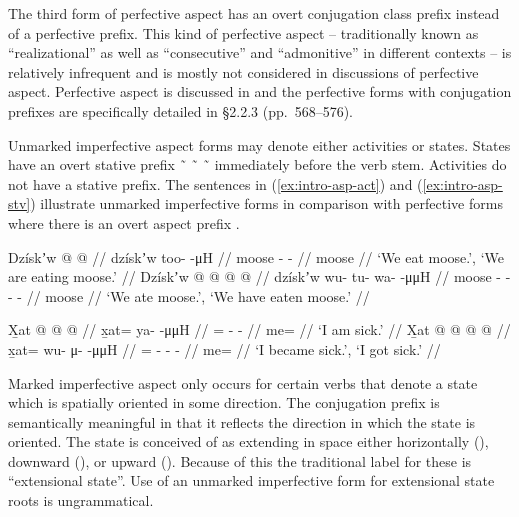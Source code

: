 \documentclass[12pt,letterpaper,oneside,article]{memoir}
\begin{document}
The third form of perfective aspect has an overt conjugation class prefix instead of a perfective prefix.
This kind of perfective aspect – traditionally known as “realizational” as well as “consecutive” and “admonitive” in different contexts – is relatively infrequent and is mostly not considered in discussions of perfective aspect.
Perfective aspect is discussed in \cite[ch.\ 6 §2.2]{crippen:2019} and the perfective forms with conjugation prefixes are specifically detailed in §2.2.3 (pp.\ 568–576).

Unmarked imperfective aspect forms may denote either activities or states.
States have an overt stative prefix  \~\  \~\  \~\  immediately before the verb stem.
Activities do not have a stative prefix.
The sentences in (\ref{ex:intro-asp-act}) and (\ref{ex:intro-asp-stv}) illustrate unmarked imperfective forms in comparison with perfective forms where there is an overt aspect prefix .

\pex\label{ex:intro-asp-act}%
\a\label{ex:intro-asp-act-impfv}%
%
\begingl
	\gla	Dzískʼw  @ {} @ {} //
	\glb	dzískʼw	too-  -μH //
	\glc	moose -  - //
	\gld	moose  {} {} //
	\glft	‘We eat moose.’, ‘We are eating moose.’
		//
\endgl
\a\label{ex:intro-asp-act-pfv}%
%
\begingl
	\gla	Dzískʼw  @ {} @ {} @ {} @ {} //
	\glb	dzískʼw	wu- tu- wa-  -μμH //
	\glc	moose - - -  - //
	\gld	moose  {} {} {} {} //
	\glft	‘We ate moose.’, ‘We have eaten moose.’
		//
\endgl
\xe

\pex\label{ex:intro-asp-stv}%
\a\label{ex:intro-asp-stv-impfv}%
%
\begingl
	\gla	X̱at @  @ {} @ {} //
	\glb	x̱at= ya-  -μμH //
	\glc	{}= -  - //
	\gld	me=  {} {} //
	\glft	‘I am sick.’
		//
\endgl
\a\label{ex:intro-asp-stv-pfv}%
%
\begingl
	\gla	X̱at @  @ {} @ {} @ {} //
	\glb	x̱at= wu- μ-  -μμH //
	\glc	{}= - -  - //
	\gld	me=  {} {} {} //
	\glft	‘I became sick.’, ‘I got sick.’
		//
\endgl
\xe

Marked imperfective aspect only occurs for certain verbs that denote a state which is spatially oriented in some direction.
The conjugation prefix is semantically meaningful in that it reflects the direction in which the state is oriented.
The state is conceived of as extending in space either horizontally (), downward (), or upward ().
Because of this the traditional label for these is “extensional state”.
Use of an unmarked imperfective form for extensional state roots is ungrammatical.
\end{document}
